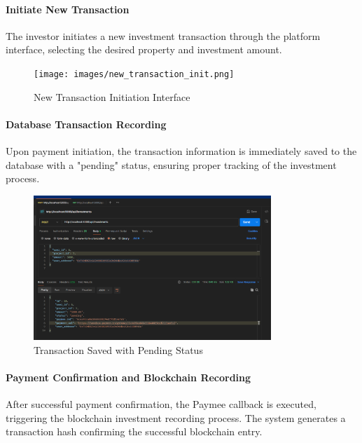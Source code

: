\paragraph{ Initiate New Transaction}
The investor initiates a new investment transaction through the platform interface, selecting the desired property and investment amount.

\begin{figure}[htbp]
    \centering
    \texttt{[image: images/new\_transaction\_init.png]}
    \caption{New Transaction Initiation Interface}
    \label{fig:new-transaction-init}
\end{figure}


\paragraph{ Database Transaction Recording}
Upon payment initiation, the transaction information is immediately saved to the database with a "pending" status, ensuring proper tracking of the investment process.

\begin{figure}[htbp]
    \centering
    \includegraphics[width=0.8\textwidth]{images/transaction_pending_status.png}
    \caption{Transaction Saved with Pending Status}
    \label{fig:transaction-pending-status}
\end{figure}

\newpage

\paragraph{Payment Confirmation and Blockchain Recording}
After successful payment confirmation, the Paymee callback is executed, triggering the blockchain investment recording process. The system generates a transaction hash confirming the successful blockchain entry.

